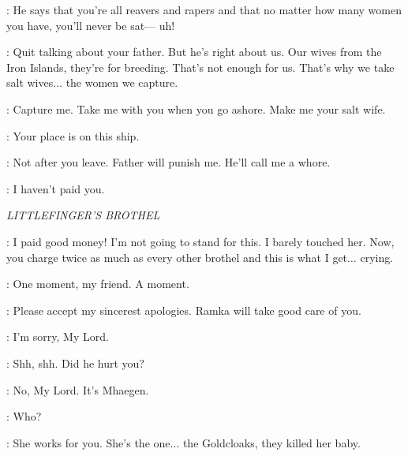 \WOMAN: He says that you're all reavers and rapers and that no matter how many women you have, you'll never be sat--- uh!


\THEON: Quit talking about your father. But he's right about us. Our wives from the Iron Islands, they're for breeding. That's not enough for us. That's why we take salt wives$\ldots$ the women we capture.

\WOMAN: Capture me. Take me with you when you go ashore. Make me your salt wife.

\THEON: Your place is on this ship.

\WOMAN: Not after you leave. Father will punish me. He'll call me a whore.

\THEON: I haven't paid you.



\scene

\textit{LITTLEFINGER'S BROTHEL}


\CLIENT: I paid good money! I'm not going to stand for this. I barely touched her. Now, you charge twice as much as every other brothel and this is what I get$\ldots$ crying.

\LITTLEFINGER: One moment, my friend. A moment.


\LITTLEFINGER: Please accept my sincerest apologies. Ramka will take good care of you.


\ROS: I'm sorry, My Lord.

\LITTLEFINGER: Shh, shh. Did he hurt you?

\ROS: No, My Lord. It's Mhaegen.

\LITTLEFINGER: Who?

\ROS: She works for you. She's the one$\ldots$ the Goldcloaks, they killed her baby.

